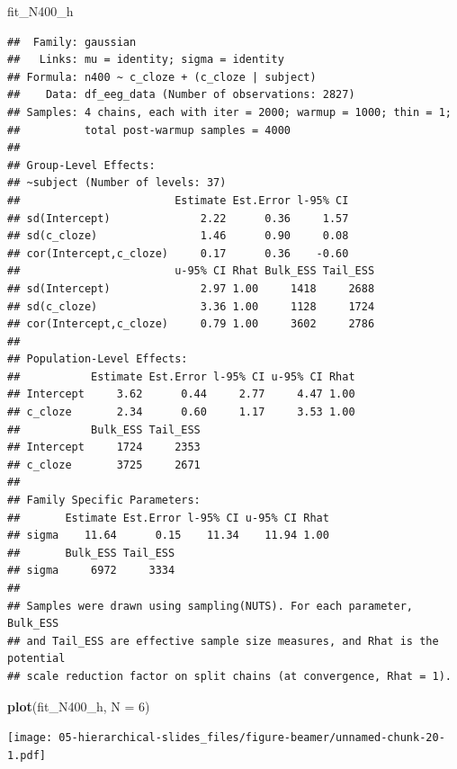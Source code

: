 \documentclass[12pt,ignorenonframetext,aspectratio=169]{beamer}
\newenvironment{Shaded}{\begin{snugshade}}{\end{snugshade}}
\newcommand{\DataTypeTok}[1]{\textcolor[rgb]{0.13,0.29,0.53}{#1}}
\newcommand{\DecValTok}[1]{\textcolor[rgb]{0.00,0.00,0.81}{#1}}
\newcommand{\KeywordTok}[1]{\textcolor[rgb]{0.13,0.29,0.53}{\textbf{#1}}}
\newcommand{\NormalTok}[1]{#1}
\begin{document}
\begin{frame}[fragile]

\scriptsize

\begin{Shaded}
\begin{Highlighting}[]
\NormalTok{fit_N400_h}
\end{Highlighting}
\end{Shaded}

\begin{verbatim}
##  Family: gaussian 
##   Links: mu = identity; sigma = identity 
## Formula: n400 ~ c_cloze + (c_cloze | subject) 
##    Data: df_eeg_data (Number of observations: 2827) 
## Samples: 4 chains, each with iter = 2000; warmup = 1000; thin = 1;
##          total post-warmup samples = 4000
## 
## Group-Level Effects: 
## ~subject (Number of levels: 37) 
##                        Estimate Est.Error l-95% CI
## sd(Intercept)              2.22      0.36     1.57
## sd(c_cloze)                1.46      0.90     0.08
## cor(Intercept,c_cloze)     0.17      0.36    -0.60
##                        u-95% CI Rhat Bulk_ESS Tail_ESS
## sd(Intercept)              2.97 1.00     1418     2688
## sd(c_cloze)                3.36 1.00     1128     1724
## cor(Intercept,c_cloze)     0.79 1.00     3602     2786
## 
## Population-Level Effects: 
##           Estimate Est.Error l-95% CI u-95% CI Rhat
## Intercept     3.62      0.44     2.77     4.47 1.00
## c_cloze       2.34      0.60     1.17     3.53 1.00
##           Bulk_ESS Tail_ESS
## Intercept     1724     2353
## c_cloze       3725     2671
## 
## Family Specific Parameters: 
##       Estimate Est.Error l-95% CI u-95% CI Rhat
## sigma    11.64      0.15    11.34    11.94 1.00
##       Bulk_ESS Tail_ESS
## sigma     6972     3334
## 
## Samples were drawn using sampling(NUTS). For each parameter, Bulk_ESS
## and Tail_ESS are effective sample size measures, and Rhat is the potential
## scale reduction factor on split chains (at convergence, Rhat = 1).
\end{verbatim}

\normalsize

\end{frame}

\begin{frame}[fragile]

\small

\begin{Shaded}
\begin{Highlighting}[]
\KeywordTok{plot}\NormalTok{(fit_N400_h, }\DataTypeTok{N =} \DecValTok{6}\NormalTok{)}
\end{Highlighting}
\end{Shaded}

\texttt{[image: 05-hierarchical-slides\_files/figure-beamer/unnamed-chunk-20-1.pdf]}

\normalsize

\end{frame}
\end{document}
